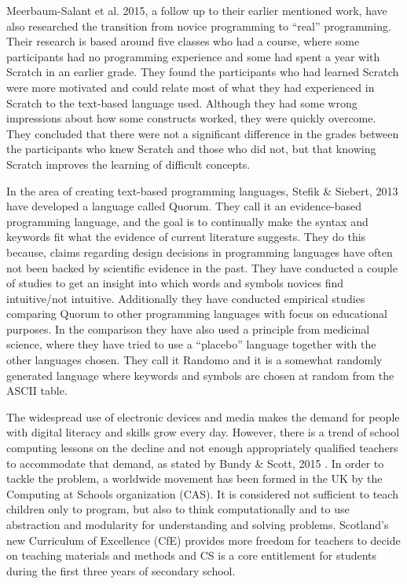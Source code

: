 Meerbaum-Salant et al. 2015\cite{from_scratch_to_real}, a follow up to their earlier mentioned work, have also researched the transition from novice programming to ``real'' programming. Their research is based around five classes who had a course, where some participants had no programming experience and some had spent a year with Scratch in an earlier grade. They found the participants who had learned Scratch were more motivated and could relate most of what they had experienced in Scratch to the text-based language used. Although they had some wrong impressions about how some constructs worked, they were quickly overcome. They concluded that there were not a significant difference in the grades between the participants who knew Scratch and those who did not, but that knowing Scratch improves the learning of difficult concepts.

In the area of creating text-based programming languages, Stefik \& Siebert, 2013\cite{stefik_all_studies} have developed a language called Quorum. They call it an evidence-based programming language, and the goal is to continually make the syntax and keywords fit what the evidence of current literature suggests. They do this because, claims regarding design decisions in programming languages have often not been backed by scientific evidence in the past\cite{ShaneMarkstrum10}. They have conducted a couple of studies to get an insight into which words and symbols novices find intuitive/not intuitive. Additionally they have conducted empirical studies comparing Quorum to other programming languages with focus on educational purposes. In the comparison they have also used a principle from medicinal science, where they have tried to use a ``placebo'' language together with the other languages chosen. They call it Randomo and it is a somewhat randomly generated language where keywords and symbols are chosen at random from the ASCII table.

The widespread use of electronic devices and media makes the demand for people with digital literacy and skills grow every day. However, there is a trend of school computing lessons on the decline and not enough appropriately qualified teachers to accommodate that demand, as stated by Bundy \& Scott, 2015 \cite{CompThinking}.
In order to tackle the problem, a worldwide movement has been formed in the UK by the Computing at Schools organization (CAS)\cite{CAS}.  It is considered not sufficient to teach children only to program, but also to think computationally and to use abstraction and modularity for understanding and solving problems. Scotland's new Curriculum of Excellence (CfE) provides more freedom for teachers to decide on teaching materials and methods and CS is a core entitlement for  students during the first three years of secondary school.

